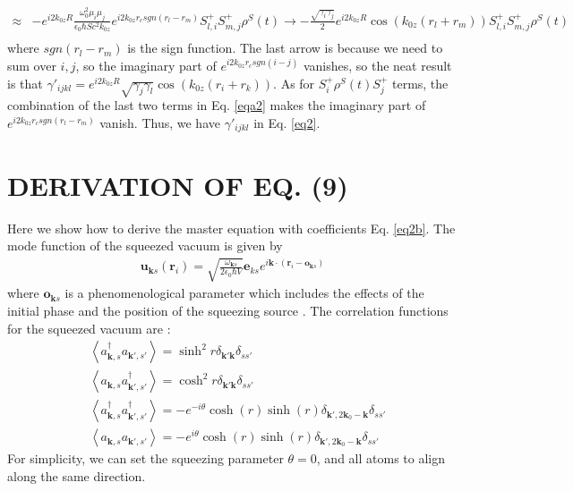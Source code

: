 \documentclass[aps,showpacs,twocolumn,twoside,groupedaddress]{revtex4}
\let\vec\bm
\begin{document}
\begin{widetext}
\begin{equation}
\begin{split}
\approx&-e^{i2k_{0z}R}\frac{\omega_{0}^{2}\mu_{i}\mu_{j}}{\epsilon_{0}\hbar Sc^{2}k_{0z}}e^{i2k_{0z}r_{c}sgn(r_{l}-r_{m})}S_{l,i}^{+}S_{m,j}^{+}\rho^{S}(t)\rightarrow-\frac{\sqrt{\gamma_{i}\gamma_{j}}}{2}e^{i2k_{0z}R}\cos(k_{0z}(r_{l}+r_{m}))S_{l,i}^{+}S_{m,j}^{+}\rho^{S}(t)\\
\end{split}
\end{equation}
where $sgn(r_{l}-r_{m})$ is the sign function. The last arrow is because we need to sum over $i,j$, so the imaginary part of $e^{i2k_{0z}r_{c}sgn(i-j)}$ vanishes, so the neat result is that $\gamma'_{ijkl}=e^{i2k_{0z}R}\sqrt{\gamma_{j}\gamma_{l}}\cos(k_{0z}(r_{i}+r_{k}))$. As for $S_{i}^{+}\rho^{S}(t)S_{j}^{+}$ terms, the combination of the last two terms in Eq. \eqref{eqa2} makes the imaginary part of $e^{i2k_{0z}r_{c}sgn(r_{l}-r_{m})}$ vanish. Thus, we have $\gamma'_{ijkl}$ in Eq. \eqref{eq2}. 

\section{DERIVATION OF EQ. (9) }
Here we show how to derive the master equation with coefficients Eq. \eqref{eq2b}. The mode function of the squeezed vacuum is given by
\begin{equation}
  \label{eq2b}
  \begin{gathered}
\vec{u}_{\vec{k}s}(\vec{r}_{i})=\sqrt{\frac{\omega_{\vec{k}s}}{2\epsilon_{0}\hbar V}}\vec{e}_{ks}e^{i\vec{k}\cdot(\vec{r}_{i}-\vec{o}_{\vec{k}s})}
 \end{gathered}
\end{equation}
where $\vec{o}_{\vec{k}s} $ is a phenomenological parameter which includes the effects of the initial phase and the position of the squeezing source \cite{You2018}. The correlation functions for the squeezed vacuum are \cite{scully1999quantum}:
\begin{equation}
\label{eq0a}
\begin{split}
& \left\langle a_{\vec{k},s}^{\dagger}a_{\vec{k}',s'}\right\rangle =\sinh^{2}r\delta_{\vec{k}'\vec{k}}\delta_{ss'} \\
& \left\langle a_{\vec{k},s}a_{\vec{k}',s'}^{\dagger}\right\rangle =\cosh^{2}r\delta_{\vec{k}'\vec{k}}\delta_{ss'}\\
& \left\langle a_{\vec{k},s}^{\dagger}a_{\vec{k}',s'}^{\dagger}\right\rangle =-e^{-i\theta}\cosh(r)\sinh(r)\delta_{\vec{k}',2\vec{k}_{0}-\vec{k}}\delta_{ss'}\\
&\left\langle a_{\vec{k},s}a_{\vec{k}',s'}\right\rangle =-e^{i\theta}\cosh(r)\sinh(r)\delta_{\vec{k}',2\vec{k}_{0}-\vec{k}}\delta_{ss'}
\end{split}
\end{equation}
For simplicity, we can set the squeezing parameter $\theta=0$, and all atoms to align along the same direction.


\end{widetext}
\end{document}
